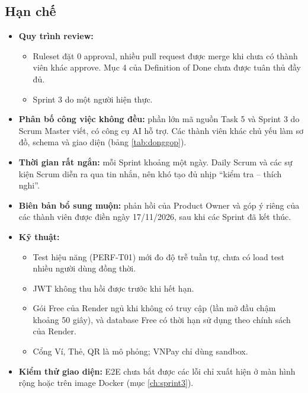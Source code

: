 \subsection{Hạn chế}\label{sec:hanche}
\begin{itemize}
\item \textbf{Quy trình review:}
  \begin{itemize}
  \item Ruleset đặt 0 approval, nhiều pull request được merge khi chưa có thành viên khác approve. Mục 4 của Definition of Done chưa được tuân thủ đầy đủ.
  \item Sprint 3 do một người hiện thực.
  \end{itemize}
\item \textbf{Phân bố công việc không đều:} phần lớn mã nguồn Task 5 và Sprint 3 do Scrum Master viết, có công cụ AI hỗ trợ. Các thành viên khác chủ yếu làm sơ đồ, schema và giao diện (bảng \ref{tab:donggop}).
\item \textbf{Thời gian rất ngắn:} mỗi Sprint khoảng một ngày. Daily Scrum và các sự kiện Scrum diễn ra qua tin nhắn, nên khó tạo đủ nhịp ``kiểm tra -- thích nghi''.
\item \textbf{Biên bản bổ sung muộn:} phản hồi của Product Owner và góp ý riêng của các thành viên được điền ngày 17/11/2026, sau khi các Sprint đã kết thúc.
\item \textbf{Kỹ thuật:}
  \begin{itemize}
  \item Test hiệu năng (PERF-T01) mới đo độ trễ tuần tự, chưa có load test nhiều người dùng đồng thời.
  \item JWT không thu hồi được trước khi hết hạn.
  \item Gói Free của Render ngủ khi không có truy cập (lần mở đầu chậm khoảng 50 giây), và database Free có thời hạn sử dụng theo chính sách của Render.
  \item Cổng Ví, Thẻ, QR là mô phỏng; VNPay chỉ dùng sandbox.
  \end{itemize}
\item \textbf{Kiểm thử giao diện:} E2E chưa bắt được các lỗi chỉ xuất hiện ở màn hình rộng hoặc trên image Docker (mục \ref{ch:sprint3}).
\end{itemize}

